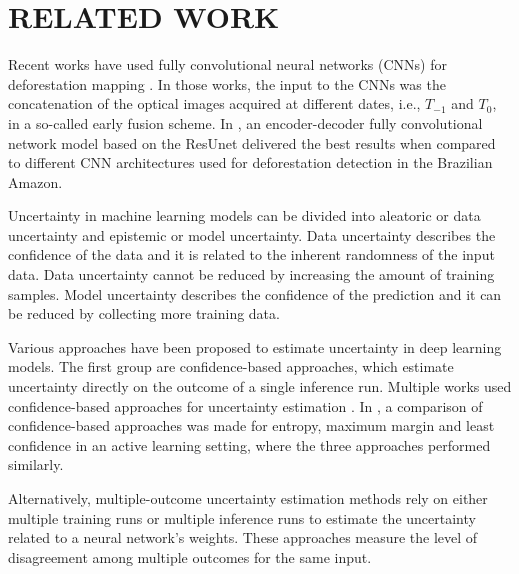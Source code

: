 \chapter{RELATED WORK}\label{sect:RelatetWorks}

Recent works have used fully convolutional neural networks (CNNs) for deforestation mapping \cite{ortega2021comparison, adarme2022multi, torres2021deforestation}. In those works, the input to the CNNs was the concatenation of the optical images acquired at different dates, i.e., $T_{-1}$ and $T_{0}$, in a so-called early fusion scheme. In \cite{ortega2021comparison}, an encoder-decoder fully convolutional network model based on the ResUnet \cite{jha2019resunet++} delivered the best results when compared to different CNN architectures used for deforestation detection in the Brazilian Amazon. 

Uncertainty in machine learning models can be divided into aleatoric or data uncertainty and epistemic or model uncertainty. Data uncertainty describes the confidence of the data and it is related to the inherent randomness of the input data. Data uncertainty cannot be reduced by increasing the amount of training samples. Model uncertainty describes the confidence of the prediction and it can be reduced by collecting more training data.



Various approaches have been proposed to estimate uncertainty in deep learning models. The first group are confidence-based approaches, which estimate uncertainty directly on the outcome of a single inference run. Multiple works used confidence-based approaches for uncertainty estimation \cite{amorocho1973entropy, wang2014new, zhan2022comparative}. In \cite{wang2014new}, a comparison of confidence-based approaches was made for entropy, maximum margin and least confidence in an active learning setting, where the three approaches performed similarly. 

Alternatively, multiple-outcome uncertainty estimation methods rely on either multiple training runs or multiple inference runs to estimate the uncertainty related to a neural network's weights. These approaches measure the level of disagreement among multiple outcomes for the same input. 



